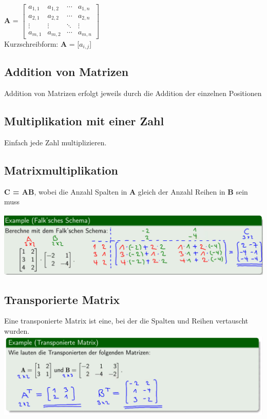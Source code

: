 \documentclass[12pt]{scrartcl}
\begin{document}
\renewcommand{\arraystretch}{1}
\textbf{A} = 
$
\begin{bmatrix}
    a_{1,1} & a_{1,2} & \cdots & a_{1,n}\\
    a_{2,1} & a_{2,2} & \cdots & a_{2,n}\\
    \vdots & \vdots & \ddots & \vdots\\
    a_{m,1} & a_{m,2} & \cdots & a_{m,n}
\end{bmatrix}$\\


Kurzschreibform: \textbf{A} = [$a_{i,j}$]\\


\subsection{Addition von Matrizen}

Addition von Matrizen erfolgt jeweils durch die Addition der einzelnen Positionen


\subsection{Multiplikation mit einer Zahl}
Einfach jede Zahl multiplizieren.


\subsection{Matrixmultiplikation}
\textbf{C = AB}, wobei die Anzahl Spalten in \textbf{A} gleich der Anzahl Reihen in \textbf{B}
sein muss

\includegraphics[width=15cm]{img/matrizenmultiplikation.png}

\newpage
\subsection{Transporierte Matrix}
Eine transponierte Matrix ist eine, bei der die Spalten und Reihen vertauscht wurden.\\

\includegraphics[width=15cm]{img/transponierte_matrix.png}
\end{document}

